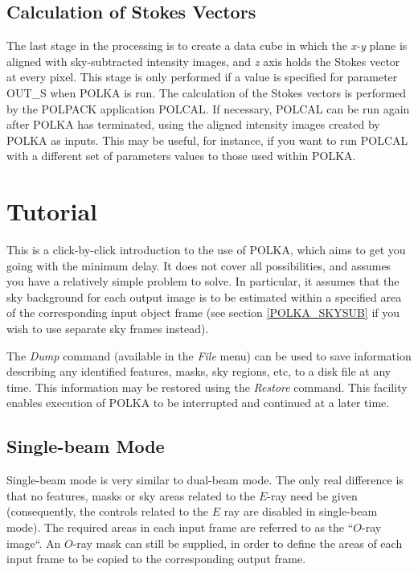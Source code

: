 \documentclass[11pt]{article}
\newcommand{\hyperref}[4]{#2\ref{#4}#3}
\newcommand{\htmlref}[2]{#1}
\newcommand{\xref}[3]{#1}
\newcommand{\xlabel}[1]{}
\newcommand{\mylabel}[1] {\xlabel{#1}\label{#1}}
\begin{document}
\subsection{\mylabel{POLKA_STOCAL}Calculation of Stokes Vectors}
The last stage in the processing is to create a data cube in which the
\emph{x-y} plane is aligned with sky-subtracted intensity images, and
\emph{z} axis holds the Stokes vector at every pixel. This stage is only
performed if a value is specified for parameter \xref{OUT\_S}{sun223}{POLKA}
when POLKA is run. The calculation of the Stokes vectors is performed by
the POLPACK application \xref{POLCAL}{sun223}{POLCAL}. If necessary,
POLCAL can be run again after POLKA has terminated, using the aligned
intensity images created by POLKA as inputs. This may be useful, for
instance, if you want to run POLCAL with a different set of parameters
values to those used within POLKA.

\section {\mylabel{POLKA_TUTORIAL}Tutorial}
This is a click-by-click introduction to the use of POLKA, which aims to
get you going with the minimum delay. It does not cover all possibilities,
and assumes you have a relatively simple problem to solve. In particular,
it assumes that the sky background for each output image is to be
estimated within a specified area of the corresponding input object frame
(see \hyperref{here}{section }{}{POLKA_SKYSUB} if you wish to use
separate sky frames instead).

The \htmlref{\emph{Dump}}{POLKA_DUMP} command (available in the
\htmlref{\emph{File}}{POLKA_FILE_MENU} menu) can be used to save
information describing any identified features, masks, sky regions, etc,
to a disk file at any time. This information may be restored using the
\htmlref{\emph{Restore}}{POLKA_RESTORE} command. This facility enables
execution of POLKA to be interrupted and continued at a later time.

\subsection {\mylabel{POLKA_SBEAM_TUT}Single-beam Mode}
Single-beam mode is very similar to dual-beam mode. The only real
difference is that no features, masks or sky areas related to the $E$-ray
need be given (consequently, the controls related to the $E$ ray are
disabled in single-beam mode). The required areas in each input frame are
referred to as the ``$O$-ray image``. An $O$-ray mask can still be
supplied, in order to define the areas of each input frame to be copied
to the corresponding output frame.
\end{document}
